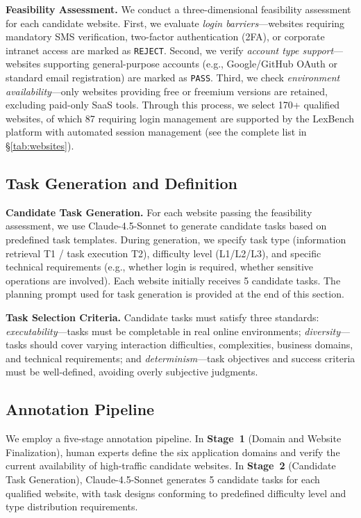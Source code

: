 \textbf{Feasibility Assessment.} We conduct a three-dimensional feasibility assessment for each candidate website. First, we evaluate \textit{login barriers}---websites requiring mandatory SMS verification, two-factor authentication (2FA), or corporate intranet access are marked as \texttt{REJECT}. Second, we verify \textit{account type support}---websites supporting general-purpose accounts (e.g., Google/GitHub OAuth or standard email registration) are marked as \texttt{PASS}. Third, we check \textit{environment availability}---only websites providing free or freemium versions are retained, excluding paid-only SaaS tools. Through this process, we select 170+ qualified websites, of which 87 requiring login management are supported by the LexBench platform with automated session management (see the complete list in \S\ref{tab:websites}).

\subsection{Task Generation and Definition}

\textbf{Candidate Task Generation.} For each website passing the feasibility assessment, we use Claude-4.5-Sonnet to generate candidate tasks based on predefined task templates. During generation, we specify task type (information retrieval T1 / task execution T2), difficulty level (L1/L2/L3), and specific technical requirements (e.g., whether login is required, whether sensitive operations are involved). Each website initially receives 5 candidate tasks. The planning prompt used for task generation is provided at the end of this section.

\textbf{Task Selection Criteria.} Candidate tasks must satisfy three standards: \textit{executability}---tasks must be completable in real online environments; \textit{diversity}---tasks should cover varying interaction difficulties, complexities, business domains, and technical requirements; and \textit{determinism}---task objectives and success criteria must be well-defined, avoiding overly subjective judgments.

\subsection{Annotation Pipeline}

We employ a five-stage annotation pipeline. In \textbf{Stage~1} (Domain and Website Finalization), human experts define the six application domains and verify the current availability of high-traffic candidate websites. In \textbf{Stage~2} (Candidate Task Generation), Claude-4.5-Sonnet generates 5 candidate tasks for each qualified website, with task designs conforming to predefined difficulty level and type distribution requirements.

